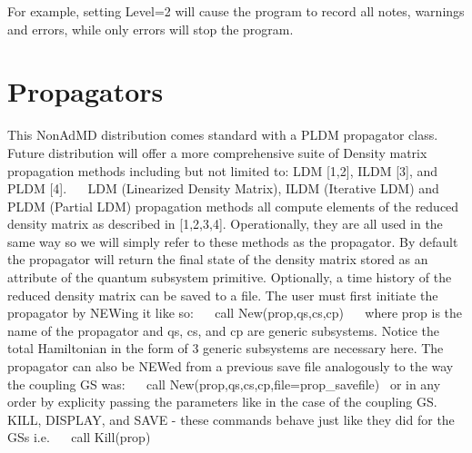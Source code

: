  For example, setting Level=2 will cause the program to record all notes, warnings and errors, while only errors will stop the program.~\newline
\hypertarget{_interface_Propagators}{}\section{Propagators}\label{_interface_Propagators}
This Non\+Ad\+MD distribution comes standard with a P\+L\+DM propagator class. Future distribution will offer a more comprehensive suite of Density matrix propagation methods including but not limited to\+: L\+DM \mbox{[}1,2\mbox{]}, I\+L\+DM \mbox{[}3\mbox{]}, and P\+L\+DM \mbox{[}4\mbox{]}.~\newline
~\newline
L\+DM (Linearized Density Matrix), I\+L\+DM (Iterative L\+DM) and P\+L\+DM (Partial L\+DM) propagation methods all compute elements of the reduced density matrix as described in \mbox{[}1,2,3,4\mbox{]}. Operationally, they are all used in the same way so we will simply refer to these methods as the \textquotesingle{}propagator\textquotesingle{}. By default the propagator will return the final state of the density matrix stored as an attribute of the quantum subsystem primitive. Optionally, a time history of the reduced density matrix can be saved to a file. The user must first initiate the propagator by N\+E\+Wing it like so\+:~\newline
~\newline
 call New(prop,qs,cs,cp)~\newline
~\newline
where \textquotesingle{}prop\textquotesingle{} is the name of the propagator and qs, cs, and cp are generic subsystems. Notice the total Hamiltonian in the form of 3 generic subsystems are necessary here. The propagator can also be N\+E\+Wed from a previous save file analogously to the way the coupling GS was\+:~\newline
~\newline
 call New(prop,qs,cs,cp,file=\textquotesingle{}prop\+\_\+savefile\textquotesingle{})~\newline
or in any order by explicity passing the parameters like in the case of the coupling GS.~\newline
K\+I\+LL, D\+I\+S\+P\+L\+AY, and S\+A\+VE -\/ these commands behave just like they did for the G\+Ss i.\+e.~\newline
~\newline
 call Kill(prop)~\newline

